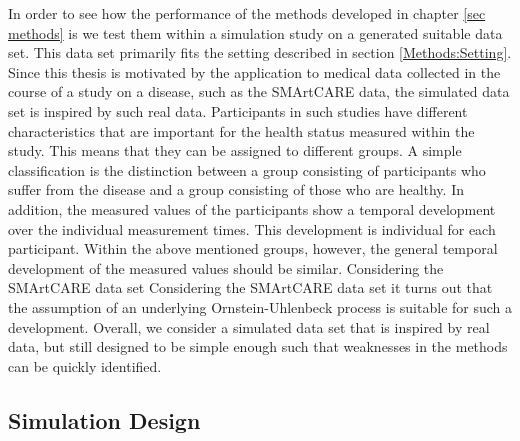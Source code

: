 \documentclass[11pt,titlepage]{article}
\theoremstyle{definition}
\theoremstyle{remark}
\begin{document}
	In order to see how the performance of the methods developed in chapter \ref{sec methods} is we test them within a simulation study on a generated suitable data set. This data set primarily fits the setting described in section \ref{Methods:Setting}. Since this thesis is motivated by the application to medical data collected in the course of a study on a disease, such as the SMArtCARE data, the simulated data set is inspired by such real data. Participants in such studies have different characteristics that are important for the health status measured within the study. This means that they can be assigned to different groups. A simple classification is the distinction between a group consisting of participants who suffer from the disease and a group consisting of those who are healthy. In addition, the measured values of the participants show a temporal development over the individual measurement times. This development is individual for each participant. Within the above mentioned groups, however, the general temporal development of the measured values should be similar. Considering the SMArtCARE data set Considering the SMArtCARE data set it turns out that the assumption of an underlying Ornstein-Uhlenbeck process is suitable for such a development. Overall, we consider a simulated data set that is inspired by real data, but still designed to be simple enough such that weaknesses in the methods can be quickly identified.
	
	\subsection{Simulation Design}\label{sec simulation design}
	
\end{document}
